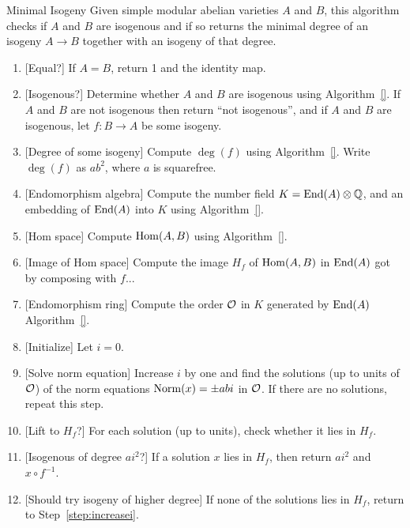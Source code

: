 \documentclass{article}
\begin{document}
\begin{algorithm}{Minimal Isogeny}
	Given simple modular abelian varieties $A$ and $B$,
	this algorithm checks if $A$ and $B$ are isogenous and if so returns the
	minimal degree of an isogeny $A \to B$ together with an isogeny of
	that degree.
	\begin{enumerate}
		\item{} [Equal?]  If $A=B$, return 1 and the identity map.
		\item{} [Isogenous?]  Determine whether $A$ and $B$ are isogenous using Algorithm~\ref{}.
		      If $A$ and $B$ are not isogenous then return ``not isogenous'', and if
		      $A$ and $B$ are isogenous, let $f : B \to A$ be some isogeny.
		\item{} [Degree of some isogeny] Compute $\deg(f)$ using Algorithm~\ref{}. Write $\deg(f)$ as $a b^2$, where
		      $a$ is squarefree.
		\item{} [Endomorphism algebra] Compute the number field $K=\operatorname{End}(A)\otimes\mathbb{Q}$, and
		      an embedding of $\operatorname{End}(A)$ into $K$ using Algorithm~\ref{}.
		\item{} [Hom space] Compute $\operatorname{Hom}(A,B)$ using Algorithm~\ref{}.
		\item{} [Image of Hom space] Compute the image $H_f$ of $\operatorname{Hom}(A,B)$ in $\operatorname{End}(A)$
		      got by composing with $f$...
		\item{} [Endomorphism ring] Compute the order $\mathcal{O}$ in $K$ generated by $\operatorname{End}(A)$
		      Algorithm~\ref{}.
		\item{} [Initialize] Let $i = 0$.
		\item{} [Solve norm equation]\label{step:increasei} Increase $i$ by one and find the solutions (up to units of $\mathcal{O}$) of the norm equations
		      $\operatorname{Norm}(x) = \pm a b i$ in $\mathcal{O}$. If there are no solutions, repeat this step.
		\item{} [Lift to $H_f$?] For each solution (up to units), check whether it lies in $H_f$.
		\item{} [Isogenous of degree $ai^2$?] If a solution $x$ lies in $H_f$, then return $a  i^2$ and $x\circ f^{-1}$.
		\item{} [Should try isogeny of higher degree] If none of the solutions lies in $H_f$, return
		      to Step~\ref{step:increasei}.
	\end{enumerate}
\end{algorithm}
\end{document}

